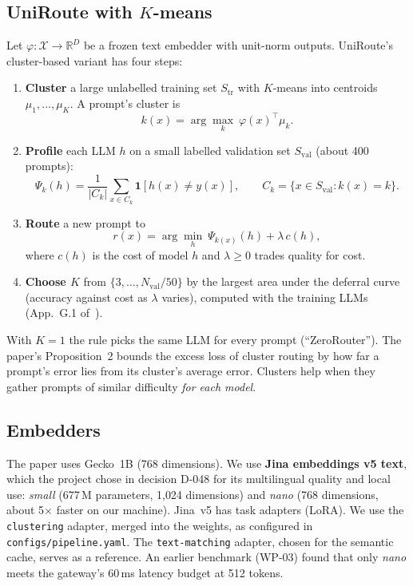 \documentclass[11pt,a4paper]{article}
\newcommand{\R}{\mathbb{R}}
\begin{document}
\subsection{UniRoute with $K$-means}

Let $\varphi:\mathcal X\to\R^{D}$ be a frozen text embedder with unit-norm outputs. UniRoute's cluster-based
variant has four steps:
\begin{enumerate}
\item \textbf{Cluster} a large unlabelled training set $S_{\mathrm{tr}}$ with $K$-means into centroids
$\mu_1,\dots,\mu_K$. A prompt's cluster is
\begin{equation}
k(x)=\arg\max_{k}\ \varphi(x)^{\top}\mu_k .\label{eq:assign}
\end{equation}
\item \textbf{Profile} each LLM $h$ on a small labelled validation set $S_{\mathrm{val}}$ (about 400 prompts):
\begin{equation}
\Psi_k(h)=\frac{1}{|C_k|}\sum_{x\in C_k}\mathbf 1\!\left[h(x)\neq y(x)\right],\qquad C_k=\{x\in S_{\mathrm{val}}:k(x)=k\}.
\label{eq:psi}
\end{equation}
\item \textbf{Route} a new prompt to
\begin{equation}
r(x)=\arg\min_{h}\ \Psi_{k(x)}(h)+\lambda\, c(h),\label{eq:route}
\end{equation}
where $c(h)$ is the cost of model $h$ and $\lambda\ge0$ trades quality for cost.
\item \textbf{Choose $K$} from $\{3,\dots,N_{\mathrm{val}}/50\}$ by the largest area under the deferral
curve (accuracy against cost as $\lambda$ varies), computed with the training LLMs (App.~G.1 of~\cite{uniroute}).
\end{enumerate}
With $K=1$ the rule picks the same LLM for every prompt (``ZeroRouter''). The paper's Proposition~2 bounds the
excess loss of cluster routing by how far a prompt's error lies from its cluster's average error. Clusters help when
they gather prompts of similar difficulty \emph{for each model}.

\subsection{Embedders}

The paper uses Gecko~1B (768 dimensions). We use \textbf{Jina embeddings v5 text}, which the project chose in
decision D-048 for its multilingual quality and local use:
\emph{small} (677\,M parameters, 1{,}024 dimensions) and \emph{nano} (768 dimensions, about 5$\times$ faster
on our machine). Jina~v5 has task adapters (LoRA). We use the \texttt{clustering} adapter, merged into the weights,
as configured in \texttt{configs/pipeline.yaml}. The \texttt{text-matching} adapter, chosen for the semantic cache,
serves as a reference. An earlier benchmark (WP-03) found that only \emph{nano} meets the gateway's 60\,ms
latency budget at 512 tokens.
\end{document}
